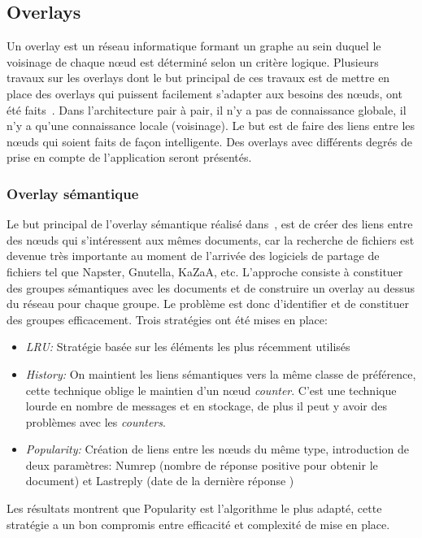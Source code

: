 	\subsection{Overlays}
	Un overlay est un réseau informatique formant un graphe au sein duquel le voisinage de chaque nœud est déterminé selon un critère logique. Plusieurs travaux sur les overlays dont le but principal de ces travaux est de mettre en place des overlays qui puissent facilement s'adapter aux besoins des nœuds, ont été faits~\cite{999375,10.1109/SRDS.2006.33,citeulike:6040284}. Dans l'architecture pair à pair, il n'y a pas de connaissance globale, il n'y a qu'une connaissance locale (voisinage). Le but est de faire des liens entre les nœuds qui soient faits de façon intelligente. Des overlays avec différents degrés de prise en compte de l'application seront présentés. 
		\subsubsection{Overlay sémantique}
			Le but principal de l'overlay sémantique réalisé dans~\cite{999375}, est de créer des liens entre des nœuds qui s'intéressent aux mêmes documents, car la recherche de fichiers est devenue très importante au moment de l'arrivée des logiciels de partage de fichiers tel que Napster, Gnutella, KaZaA, etc. L'approche consiste à constituer des groupes sémantiques avec les documents et de construire un overlay au dessus du réseau pour chaque groupe. Le problème est donc d'identifier et de constituer des groupes efficacement. Trois stratégies ont été mises en place:
		\begin{itemize}
		\renewcommand{\labelitemi}{$\bullet$}
                	\item \textit{LRU:} Stratégie basée sur les éléments les plus récemment utilisés
                	\item \textit{History:} On maintient les liens sémantiques vers la même classe de préférence, cette technique oblige le maintien d'un nœud \textit{counter}. C'est une technique lourde en nombre de messages et en stockage, de plus il peut y avoir des problèmes avec les \textit{counters}.
	                \item \textit{Popularity:} Création de liens entre les nœuds du même type, introduction de deux paramètres: Numrep (nombre de réponse positive pour obtenir le document) et Lastreply (date de la dernière réponse )
        	\end{itemize}
	        Les résultats montrent que Popularity est l'algorithme le plus adapté, cette stratégie a un bon compromis entre efficacité et complexité de mise en place.

